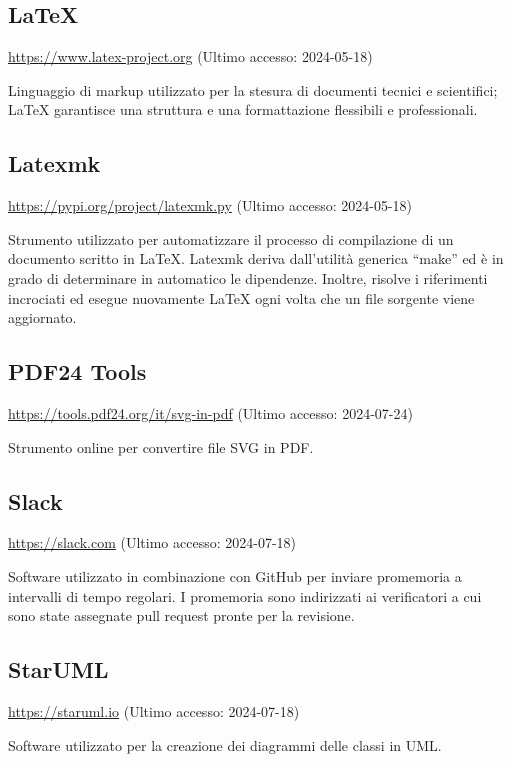 \subsection{LaTeX}
\par \href{https://www.latex-project.org}{https://www.latex-project.org} (Ultimo accesso: 2024-05-18)
\par Linguaggio di markup utilizzato per la stesura di documenti tecnici e scientifici; LaTeX garantisce una struttura e una formattazione flessibili e professionali.
    
\subsection{Latexmk}
\par \href{https://pypi.org/project/latexmk.py/}{https://pypi.org/project/latexmk.py} (Ultimo accesso: 2024-05-18)
\par Strumento utilizzato per automatizzare il processo di compilazione di un documento scritto in LaTeX. Latexmk deriva dall'utilità generica “make” ed è in grado di determinare in automatico le dipendenze. Inoltre, risolve i riferimenti incrociati ed esegue nuovamente LaTeX ogni volta che un file sorgente viene aggiornato.

\subsection{PDF24 Tools}
\par \href{https://tools.pdf24.org/it/svg-in-pdf}{https://tools.pdf24.org/it/svg-in-pdf} (Ultimo accesso: 2024-07-24)
\par Strumento online per convertire file SVG in PDF.

\subsection{Slack}
\par \href{https://slack.com}{https://slack.com} (Ultimo accesso: 2024-07-18)
\par Software utilizzato in combinazione con GitHub per inviare promemoria a intervalli di tempo regolari. I promemoria sono indirizzati ai verificatori a cui sono state assegnate pull request pronte per la revisione.

\subsection{StarUML}
\par \href{https://staruml.io}{https://staruml.io} (Ultimo accesso: 2024-07-18)
\par Software utilizzato per la creazione dei diagrammi delle classi in UML.

